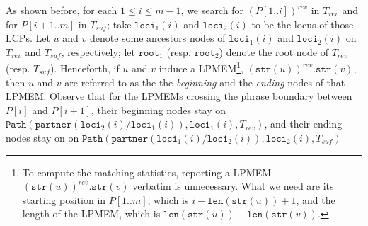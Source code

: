 \documentclass[smallabstract,smallcaptions]{dccpaper}
\def\idtt#1{\ensuremath{\mathtt{#1}}}
\def\str{\idtt{str}}
\def\partner{\idtt{partner}}
\def\path{\idtt{Path}}
\def\loci{\idtt{loci}}
\def\SpecialLeaves{\idtt{SpecialLeaves}}
\def\SpecialSkylineList{\idtt{SpecialSkylineList}}
\def\Special{\idtt{Special}}
\def\len{\idtt{len}}
\def\root{\idtt{root}}
\begin{document}
%
As shown before, for each $1\leq i\leq m-1$, we search for $(P[1..i])^{rev}$ in $T_{rev}$ and for $P[i+1..m]$ in $T_{suf}$; take $\loci_1(i)$ and $\loci_2(i)$ to be the locus of those LCPs.
Let $u$ and $v$ denote some ancestors nodes of $\loci_1(i)$ and $\loci_2(i)$ on $T_{rev}$ and $T_{suf}$, respectively; let $\root_1$ (resp. $\root_2$) denote the root node of $T_{rev}$ (resp. $T_{suf}$).
Henceforth, if $u$ and $v$ induce a LPMEM\footnote{To compute the matching statistics, reporting a LPMEM $(\str(u))^{rev}.\str(v)$ verbatim is unnecessary. What we need are its starting position in $P[1..m]$, which is $i-\len(\str(u))+1$, and the length of the LPMEM, which is $\len(\str(u))+\len(\str(v))$.}, $(\str(u))^{rev}.\str(v)$, then $u$ and $v$ are referred to as the the {\em beginning} and the {\em ending} nodes of that LPMEM.
Observe that for the LPMEMs crossing the phrase boundary between $P[i]$ and $P[i+1]$, their beginning nodes stay on $\path(\partner(\loci_2(i)/\loci_1(i)), \loci_1(i), T_{rev})$, and their ending nodes stay on on $\path(\partner(\loci_1(i)/\loci_2(i)), \loci_2(i), T_{suf})$
\end{document}
